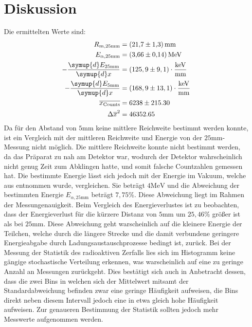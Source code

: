 \section{Diskussion}
\label{sec:Diskussion}
Die ermittelten Werte sind:
\begin{align*}
  R_{m,25 \si{\milli\metre}} &= \SI{21.7\pm1.3}{\milli\metre} \\
  E_{\alpha , 25 \si{\milli\metre}} &= \SI{3.66\pm0.14}{\mega\electronvolt} \\
  - \frac{\symup{d} E_{25 \si{\milli\metre}}}{\symup{d}x} &= (125,9 \pm 9,1) \cdot \si{\kilo\electronvolt\per\milli\metre} \\
  - \frac{\symup{d} E_{5 \si{\milli\metre}}}{\symup{d}x} &= (168,9 \pm 13,1) \cdot \si{\kilo\electronvolt\per\milli\metre} \\
  \overline{x_{\text{Counts}}} &= 6238 \pm 215.30 \\
  {\Delta\overline{x}}^2 &= 46352.65
\end{align*}
Da für den Abstand von $5 \si{\milli\metre}$ keine mittlere Reichweite bestimmt werden konnte, ist ein Vergleich mit der mittleren Reichweite und Energie von der
$25 \si{\milli\metre}$-Messung nicht möglich. Die mittlere Reichweite konnte nicht bestimmt werden, da das Präparat zu nah am Detektor war,
wodurch der Detektor wahrscheinlich nicht genug Zeit zum Abklingen hatte, und somit falsche Countzahlen gemessen hat.
Die bestimmte Energie lässt sich jedoch mit der Energie im Vakuum, welche aus \cite{1} entnommen wurde, vergleichen.
Sie beträgt $4 \si{\mega\electronvolt}$ und die Abweichung der bestimmten Energie $ E_{\alpha , 25 \si{\milli\metre}} $ beträgt $7,75 \%$.
Diese Abweichung liegt im Rahmen der Messungenauigkeit.
Beim Vergleich des Energieverlustes ist zu beobachten, dass der Energieverlust für die kürzere Distanz von $5 \si{\milli\metre}$ um $25,46 \%$ größer ist als
bei $25 \si{\milli\metre}$. Diese Abweichung geht warscheinlich auf die kleinere Energie der Teilchen, welche durch die längere Strecke und die damit verbundene geringere
Energieabgabe durch Ladungsaustauschprozesse bedingt ist, zurück. Bei der Messung der Statistik des radioaktiven Zerfalls lies sich im Histogramm keine gängige stochastische
Verteilung erkennen, was warscheinlich auf eine zu geringe Anzahl an Messungen zurückgeht. Dies bestätigt sich auch in Anbetracht dessen, dass die zwei Bins in welchen
sich der Mittelwert mitsamt der Standardabweichung befinden zwar eine geringe Häufigkeit aufweisen, die Bins direkt neben diesem Intervall jedoch eine in etwa gleich hohe
Häufigkeit aufweisen. Zur genaueren Bestimmung der Statistik sollten jedoch mehr Messwerte aufgenommen werden.
